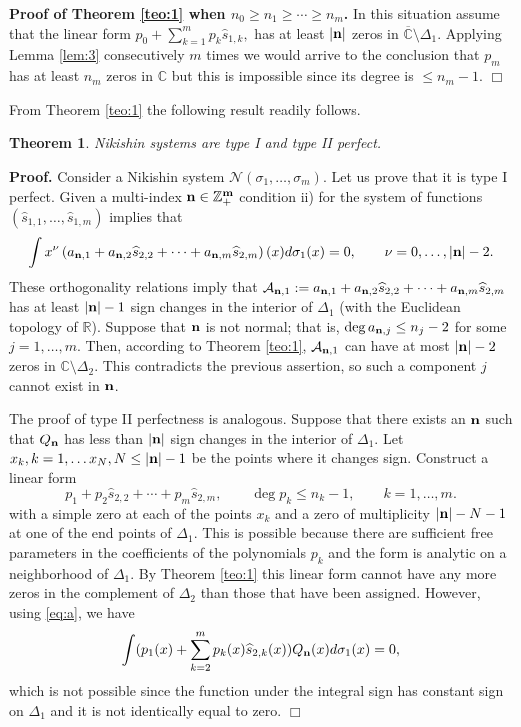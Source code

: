 \documentclass{amsart}
\newtheorem{teo}{\sc Theorem}[section]
\theoremstyle{definition}
\theoremstyle{remark}
\begin{document}
{\bf Proof of Theorem \ref{teo:1} when $n_0 \geq n_1\geq \cdots \geq n_m$.} In this situation assume that the linear form $p_0 + \sum_{k=1}^m p_k \widehat{s}_{1,k}, $ has at least $|{\bf n}|$ zeros in $\overline{\mathbb{C}} \setminus \Delta_1$. Applying Lemma \ref{lem:3} consecutively $m$ times  we would arrive to the conclusion that $p_m$ has at least $n_m$ zeros in $\mathbb{C}$ but this is impossible since its degree is $\leq n_m -1$. \hfill $\Box$

\medskip


From Theorem \ref{teo:1} the following result readily follows.

\begin{teo}\label{teo:2} Nikishin systems are type I and type II perfect.
\end{teo}

{\bf Proof.} Consider a Nikishin system ${\mathcal{N}}(\sigma_1,\ldots,\sigma_m)$. Let us prove that it is  type I perfect. Given a multi-index $\bf n \in {\mathbb{Z}}_+^{m}$ condition ii) for the system of functions $(\widehat{s}_{1,1},\ldots,\widehat{s}_{1,m})$ implies that
\[ \int x^{\nu} \left(a_{{\bf n},1} + a_{{\bf n},2} \widehat{s}_{2,2} +\cdots + a_{{\bf n},m} \widehat{s}_{2,m}\right)(x) d\sigma_1(x) = 0, \qquad \nu = 0,\ldots, |{\bf n}| -2.
\]
These orthogonality relations imply that ${\mathcal{A}}_{{\bf n},1} := a_{{\bf n},1} + a_{{\bf n},2} \widehat{s}_{2,2} +\cdots + a_{{\bf n},m} \widehat{s}_{2,m}$ has at least $|{\bf n}| -1$ sign changes in the interior of $\Delta_1$ (with the Euclidean topology of $\mathbb{R}$). Suppose that  ${\bf n}$ is not normal; that is, $\deg a_{{\bf n},j}\leq n_j -2$ for some $j =1,\ldots,m$. Then, according to Theorem \ref{teo:1}, ${\mathcal{A}}_{{\bf n},1}$ can have at most $|{\bf n}| -2$ zeros in ${\mathbb{C}} \setminus \Delta_2$. This contradicts the previous assertion, so such a component $j$ cannot exist in $\bf n$.

The proof of type II perfectness is analogous. Suppose that there exists an ${\bf n}$ such that $Q_{\bf n}$ has less than $|{\bf n}|$ sign changes in the interior of $\Delta_1$. Let $x_k, k =1,\ldots x_N, N \leq |{\bf n}| -1$ be the points where it changes sign. Construct a linear form
\[ p_{1} + p_{ 2} \widehat{s}_{2,2} +\cdots + p_{m} \widehat{s}_{2,m}, \qquad \deg p_k \leq n_k -1,\qquad k=1,\ldots,m.
\]
with a simple zero at each of the points $x_k$ and a zero of multiplicity $|{\bf n}| - N -1$ at one of the end points of $\Delta_1$. This is possible because there are sufficient free parameters in the coefficients of the polynomials $p_k$ and the form is analytic on  a neighborhood of $\Delta_1$. By Theorem \ref{teo:1} this linear form cannot have any more zeros in the complement of $\Delta_2$ than those that have been assigned. However, using
\eqref{eq:a}, we have
\[\int (p_1 (x) + \sum_{k=2}^m p_k(x)\widehat{s}_{2,k}(x))Q_{\bf n}(x) d \sigma_1(x) =0,
\]
which is not possible since the function under the integral sign has constant sign on $\Delta_1$ and it is not identically equal to zero. \hfill $\Box$
\end{document}
